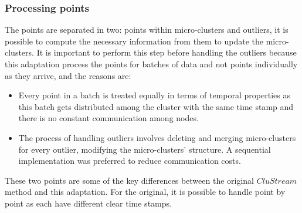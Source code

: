 % 
% 
% 



\subsubsection{Processing points}\label{procpoints}

The points are separated in two: points within micro-clusters and outliers, it is possible to compute the necessary information from them to update the micro-clusters. It is important to perform this step before handling the outliers because this adaptation process the points for batches of data and not points individually as they arrive, and the reasons are:

\begin{itemize}
 \item Every point in a batch is treated equally in terms of temporal properties as this batch gets distributed among the cluster with the same time stamp and there is no constant communication among nodes.
\item The process of handling outliers involves deleting and merging micro-clusters for every outlier, modifying the micro-clusters' structure. A sequential implementation was preferred to reduce communication costs.
\end{itemize}

These two points are some of the key differences between the original $CluStream$ method and this adaptation. For the original, it is possible to handle point by point as each have different clear time stamps.


